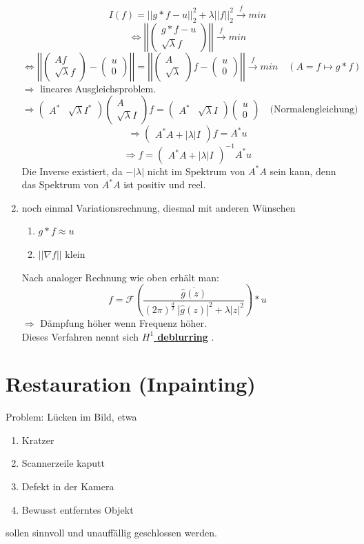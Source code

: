 \documentclass[ngerman]{article}
\theoremstyle{plain}
\theoremstyle{definition}
\numberwithin{equation}{section}
\newcommand{\norm}[1] {
\left|\left| #1 \right|\right|
}
\newcommand{\abs}[1] {
\left| #1 \right|
}
\newcommand{\F}[0]{
    \mathcal F
}
\newcommand{\mim}[1] {
\underline{\textbf{#1\index{#1}}}
}
\newcommand{\mat}[1] {
\begin{pmatrix} #1 \end{pmatrix}
}
\begin{document}
\begin{enumerate}[label = \arabic*. Ansatz:]
                    \[I(f) = \norm{g*f-u}_2^2 + \lambda \norm{f}_2^2 \overset{f}{\to} min\]
                    \[\iff \norm{\mat{g*f-u\\ \sqrt{\lambda} f}} \overset{f}{\to} min\]
                    \[\iff \norm{\mat{Af \\ \sqrt{\lambda}f} - \mat{u\\0}} = \norm{\mat{A \\ \sqrt{\lambda}}f - \mat{u\\0}} \overset{f}{\to} min \quad (A= f \mapsto g*f)\]
                    $\Rightarrow$ lineares Ausgleichsproblem.
                    \[\Rightarrow \mat{A^* &\sqrt{\lambda} I^*} \mat{A \\ \sqrt{\lambda}I}f = \mat{A^* & \sqrt{\lambda}I} \mat{u \\ 0} \quad \text{(Normalengleichung)}\]
                    \[\Rightarrow \mat{A^*A + \abs{\lambda}I}f=A^*u\]
                    \[\Rightarrow f= \mat{A^*A + \abs{\lambda}I}^{-1}A^*u\]
                    Die Inverse existiert, da $-\abs{\lambda}$ nicht im Spektrum von $A^*A$ sein kann, denn das Spektrum von $A^*A$ ist positiv und reel.
                    \item noch einmal Variationsrechnung, diesmal mit anderen Wünschen
                    \begin{enumerate}[label = \arabic*. Wunsch:]
                        \item $g *f \approx u$
                        \item $\norm{\nabla f}$ klein
                    \end{enumerate}
                    Nach analoger Rechnung wie oben erhält man:
                    \begin{equation}
                        f=\F \left( \frac{\overline{\hat g(z)}}{(2\pi)^\frac{d}{2} \ |\hat g(z)|^2 + \lambda |z|^2} \right) * u
                    \end{equation}
                    $\Rightarrow$ Dämpfung höher wenn Frequenz höher.\\
                    Dieses Verfahren nennt sich \mim{$H^1$ deblurring}.
                \end{enumerate}

                \section{Restauration (Inpainting)}
  Problem: Lücken im Bild, etwa

  \begin{enumerate}
    \item Kratzer
    \item Scannerzeile kaputt
    \item Defekt in der Kamera
    \item Bewusst entferntes Objekt
  \end{enumerate}
  sollen sinnvoll und unauffällig geschlossen werden.
\end{document}
